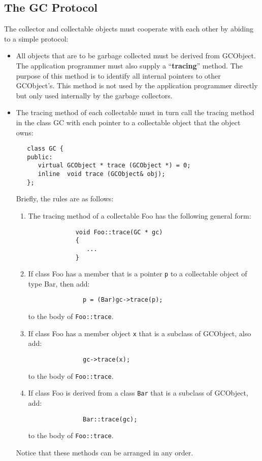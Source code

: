 \subsection{The GC Protocol}
The collector and collectable objects must cooperate with
each other by abiding to a simple protocol:
\begin{itemize}
   \item All objects that are to be garbage collected must be derived
from {\sf GCObject}.  The application programmer must also supply a
``{\bf tracing}'' method.  The purpose of this method is to identify
all internal pointers to other {\sf GCObject}'s.   This method is not
used by the application programmer directly but only used internally
by the garbage collectors.
   \item The tracing method of each collectable must in turn call
    the tracing method in the class {\sf GC} with each pointer to
    a collectable object that the object owns:
\begin{verbatim}
   class GC {
   public:
      virtual GCObject * trace (GCObject *) = 0;
      inline  void trace (GCObject& obj);
   };
\end{verbatim}
    
     Briefly, the rules are as follows:
   \begin{enumerate}
      \item The tracing method of a collectable {\sf Foo} has the following
         general form:
          \begin{verbatim}
             void Foo::trace(GC * gc) 
             {
                ...
             }
          \end{verbatim} 
      \item If class {\sf Foo} has a member that is a pointer \verb|p|
            to a collectable object of type {\sf Bar}, then add:
           \begin{verbatim}
               p = (Bar)gc->trace(p);
           \end{verbatim}
            to the body of \verb|Foo::trace|. 
     \item  If class {\sf Foo} has a member object
            \verb|x| that is a subclass of {\sf GCObject}, also add:
           \begin{verbatim}
               gc->trace(x);
           \end{verbatim}
            to the body of \verb|Foo::trace|.
     \item  If class {\sf Foo} is derived from a class \verb|Bar| that
            is a subclass of {\sf GCObject}, add:
           \begin{verbatim}
               Bar::trace(gc);
           \end{verbatim}
            to the body of \verb|Foo::trace|.
   \end{enumerate} 
    Notice that these methods can be arranged in any order.
\end{itemize}

